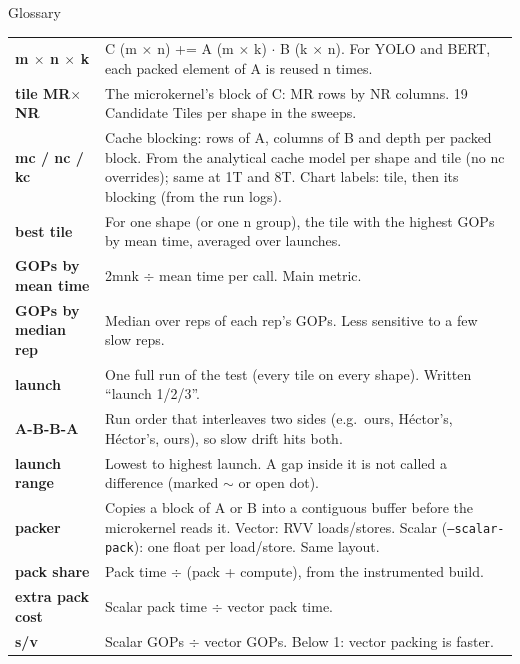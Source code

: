 \begin{frame}{Glossary}
\scriptsize
\begin{tabularx}{\textwidth}{@{}>{\bfseries}p{3.0cm} X@{}}
\toprule
m $\times$ n $\times$ k & C (m $\times$ n) += A (m $\times$ k) $\cdot$ B (k $\times$ n). For YOLO and BERT, each packed element of A is reused n times. \\
tile MR$\times$NR & The microkernel's block of C: MR rows by NR columns. 19 Candidate Tiles per shape in the sweeps. \\
mc / nc / kc & Cache blocking: rows of A, columns of B and depth per packed block. From the analytical cache model per shape and tile (no nc overrides); same at 1T and 8T. Chart labels: tile, then its blocking (from the run logs). \\
best tile & For one shape (or one n group), the tile with the highest GOPs by mean time, averaged over launches. \\
GOPs by mean time & 2mnk $\div$ mean time per call. Main metric. \\
GOPs by median rep & Median over reps of each rep's GOPs. Less sensitive to a few slow reps. \\
launch & One full run of the test (every tile on every shape). Written ``launch 1/2/3''. \\
A-B-B-A & Run order that interleaves two sides (e.g.\ ours, H\'ector's, H\'ector's, ours), so slow drift hits both. \\
launch range & Lowest to highest launch. A gap inside it is not called a difference (marked $\sim$ or open dot). \\
packer & Copies a block of A or B into a contiguous buffer before the microkernel reads it. Vector: RVV loads/stores. Scalar (\texttt{--scalar-pack}): one float per load/store. Same layout. \\
pack share & Pack time $\div$ (pack + compute), from the instrumented build. \\
extra pack cost & Scalar pack time $\div$ vector pack time. \\
s/v & Scalar GOPs $\div$ vector GOPs. Below 1: vector packing is faster. \\
\bottomrule
\end{tabularx}
\end{frame}

